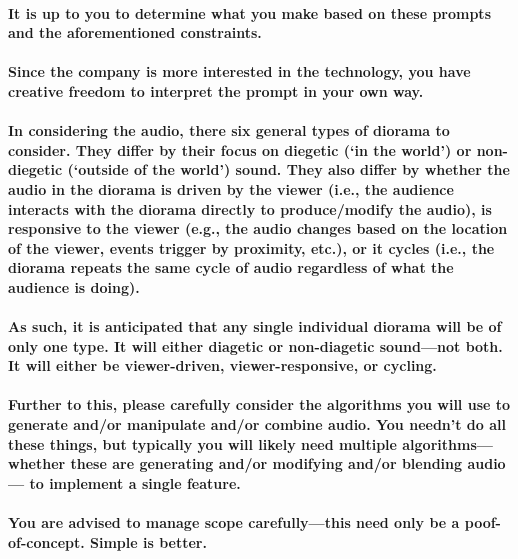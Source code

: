 \documentclass{../../fal_assignment}
\begin{document}
\begin{landscape}
\begin{table}[h]
\begin{tabular}{l|l|llll|}
\end{tabular}
\end{table}

\end{landscape}

\paragraph{It is up to you to determine what you make based on these prompts and the aforementioned constraints.}

\paragraph{Since the company is more interested in the technology, you have creative freedom to interpret the prompt in your own way.}

\paragraph{In considering the audio, there six general types of diorama to consider. They differ by their focus on diegetic (`in the world') or non-diegetic (`outside of the world') sound. They also differ by whether the audio in the diorama is driven by the viewer (i.e., the audience interacts with the diorama directly to produce/modify the audio), is responsive to the viewer (e.g., the audio changes based on the location of the viewer, events trigger by proximity, etc.), or it cycles (i.e., the diorama repeats the same cycle of audio regardless of what the audience is doing).}

\paragraph{As such, it is anticipated that any single individual diorama will be of only one type. It will either diagetic or non-diagetic sound---not both. It will either be viewer-driven, viewer-responsive, or cycling.}

\paragraph{Further to this, please carefully consider the algorithms you will use to generate and/or manipulate and/or combine audio. You needn't do all these things, but typically you will likely need multiple algorithms---whether these are generating and/or modifying and/or blending audio--- to implement a single feature.}

\paragraph{You are advised to manage scope carefully---this need only be a poof-of-concept. Simple is better.}
\end{document}
